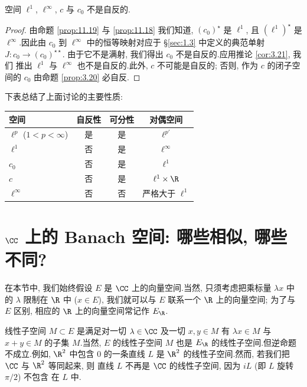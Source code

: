 \begin{proposition}
\label{prop:11.21}
空间 $\ell^1$, $\ell^\infty$, $c$ 与 $c_0$ 不是自反的.
\end{proposition}

\begin{proof}
由命题  \ref{prop:11.19} 与  \ref{prop:11.18} 我们知道, $(c_0)^\star$ 是
$\ell^1$, 且 $(\ell^1)^\star$ 是 $\ell^\infty$.因此由 $c_0$ 到 $\ell^\infty$
中的恒等映射对应于 \S \ref{sec:1.3} 中定义的典范单射 $J:c_0\to(c_0)^{\star\star}$.
由于它不是满射, 我们得出 $c_0$ 不是自反的.应用推论  \ref{cor:3.21}, 我们
推出 $\ell^1$ 与 $\ell^\infty$ 也不是自反的.此外, $c$ 不可能是自反的;
否则, 作为 $c$ 的闭子空间的 $c_0$ 由命题  \ref{prop:3.20} 必自反.
\end{proof}

下表总结了上面讨论的主要性质:

\begin{table}[htbp]
	\centering
	\begin{tabular}{lccc}
		\hline
		空间 & 自反性 & 可分性 & 对偶空间 \\
		\hline
		$\ell^p$ ($1<p<\infty$) & 是 & 是 & $\ell^{p'}$ \\
		$\ell^1$ & 否 & 是 & $\ell^\infty$ \\
		$c_0$ & 否 & 是 & $\ell^1$ \\
		$c$ & 否 & 是 & $\ell^1\times\R$ \\
		$\ell^\infty$ & 否 & 否 & 严格大于 $\ell^1$ \\
		\hline
	\end{tabular}
\end{table}
\section{\texorpdfstring{$\CC$ 上的 Banach 空间: 哪些相似, 哪些不同?}{C 上的 Banach 空间: 哪些相似, 哪些不同?}}
\label{sec:11.4}

在本节中, 我们始终假设 $E$ 是 $\CC$ 上的向量空间.当然, 只须考虑把乘标量
$\lambda x$ 中的 $\lambda$ 限制在 $\R$ 中 ($x\in E$), 我们就可以与 $E$
联系一个 $\R$ 上的向量空间; 为了与 $E$ 区别, 相应的 $\R$ 上的向量空间常记作
$E_\R$.

线性子空间 $M\subset E$ 是满足对一切 $\lambda\in\CC$ 及一切 $x,y\in M$ 有
$\lambda x\in M$ 与 $x+y\in M$ 的子集 $M$.当然, $E$ 的线性子空间 $M$ 也是
$E_\R$ 的线性子空间.但逆命题不成立.例如, $\R^2$ 中包含 $0$ 的一条直线
$L$ 是 $\R^2$ 的线性子空间.然而, 若我们把 $\CC$ 与 $\R^2$ 等同起来, 则
直线 $L$ 不再是 $\CC$ 的线性子空间, 因为 $iL$ (即 $L$ 旋转 $\pi/2$) 不包含
在 $L$ 中.

